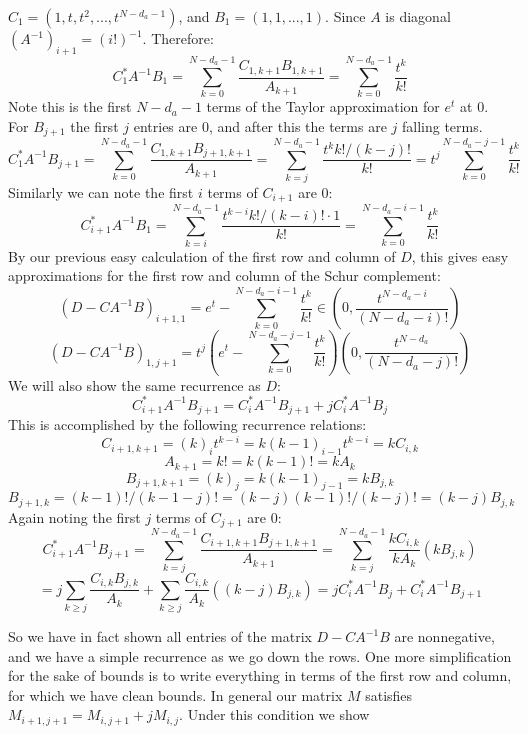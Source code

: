 \documentclass{article}
\begin{document}
$C_{1} = (1, t, t^{2}, ..., t^{N-d_{a}-1})$, and $B_{1} = (1, 1, ..., 1)$. Since $A$ is diagonal $(A^{-1})_{i+1} = (i!)^{-1}$. Therefore:
\[ C_{1}^{*} A^{-1} B_{1} = \sum_{k=0}^{N-d_{a}-1} \frac{C_{1,k+1} B_{1,k+1}}{A_{k+1}} = \sum_{k=0}^{N-d_{a}-1} \frac{t^{k}}{k!}    \]
Note this is the first $N-d_{a}-1$ terms of the Taylor approximation for $e^{t}$ at $0$. For $B_{j+1}$ the first $j$ entries are $0$, and after this the terms are $j$ falling terms. 
\[ C_{1}^{*} A^{-1} B_{j+1} = \sum_{k=0}^{N-d_{a}-1} \frac{C_{1,k+1} B_{j+1,k+1}}{A_{k+1}} = \sum_{k = j}^{N-d_{a}-1} \frac{t^{k} k! / (k-j)!}{k!} = t^{j} \sum_{k = 0}^{N-d_{a}-j-1} \frac{t^{k}}{k!}      \]
Similarly we can note the first $i$ terms of $C_{i+1}$ are $0$:
\[ C_{i+1}^{*} A^{-1} B_{1} = \sum_{k = i}^{N-d_{a}-1} \frac{ t^{k-i} k! / (k-i)! \cdot 1}{k!} = \sum_{k=0}^{N-d_{a}-i-1} \frac{t^{k}}{k!}    \]
By our previous easy calculation of the first row and column of $D$, this gives easy approximations for the first row and column of the Schur complement: 
\[ (D - C A^{-1} B)_{i+1,1} = e^{t} - \sum_{k=0}^{N-d_{a}-i-1} \frac{t^{k}}{k!} \in \left(0, \frac{t^{N-d_{a}-i}}{(N-d_{a}-i)!} \right)   \]
\[ (D - C A^{-1} B)_{1,j+1} = t^{j} \left( e^{t} - \sum_{k=0}^{N-d_{a}-j-1} \frac{t^{k}}{k!} \right) \left(0, \frac{t^{N-d_{a}}}{(N-d_{a}-j)!} \right) \]
We will also show the same recurrence as $D$:
\[ C_{i+1}^{*} A^{-1} B_{j+1} = C_{i}^{*} A^{-1} B_{j+1} + j C_{i}^{*} A^{-1} B_{j}      \]
This is accomplished by the following recurrence relations:
\[ C_{i+1,k+1} = (k)_{i} t^{k-i} = k (k-1)_{i-1} t^{k-i} = k C_{i,k} \]
\[ A_{k+1} = k! = k (k-1)! = k A_{k}  \]
\[ B_{j+1,k+1} = (k)_{j} = k (k-1)_{j-1} = k B_{j,k}     \]
\[ B_{j+1,k} = (k-1)! / (k-1-j)! = (k-j) (k-1)! / (k-j)! = (k-j) B_{j,k} \]
Again noting the first $j$ terms of $C_{j+1}$ are $0$:
\[ C_{i+1}^{*} A^{-1} B_{j+1} = \sum_{k=j}^{N-d_{a}-1} \frac{C_{i+1,k+1} B_{j+1,k+1}}{A_{k+1}} = \sum_{k=j}^{N-d_{a}-1} \frac{k C_{i,k}}{k A_{k}} (k B_{j, k})      \]
\[ = j \sum_{k \geq j} \frac{C_{i,k} B_{j,k}}{A_{k}} + \sum_{k \geq j} \frac{C_{i,k}}{A_{k}} ((k-j) B_{j,k}) = j C_{i}^{*} A^{-1} B_{j} + C_{i}^{*} A^{-1} B_{j+1}     \]

So we have in fact shown all entries of the matrix $D - C A^{-1} B$ are nonnegative, and we have a simple recurrence as we go down the rows. One more simplification for the sake of bounds is to write everything in terms of the first row and column, for which we have clean bounds. In general our matrix $M$ satisfies $M_{i+1,j+1} = M_{i,j+1} + j M_{i,j}$. Under this condition we show
\end{document}
